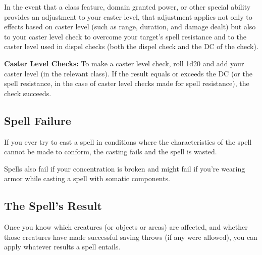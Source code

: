 In the event that a class feature, domain granted power, or other special ability provides an adjustment to your caster level, that adjustment applies not only to effects based on caster level (such as range, duration, and damage dealt) but also to your caster level check to overcome your target's spell resistance and to the caster level used in dispel checks (both the dispel check and the DC of the check).

\textbf{Caster Level Checks:} To make a caster level check, roll 1d20 and add your caster level (in the relevant class). If the result equals or exceeds the DC (or the spell resistance, in the case of caster level checks made for spell resistance), the check succeeds.

\subsection{Spell Failure}
If you ever try to cast a spell in conditions where the characteristics of the spell cannot be made to conform, the casting fails and the spell is wasted.

Spells also fail if your concentration is broken and might fail if you're wearing armor while casting a spell with somatic components.

\subsection{The Spell's Result}
Once you know which creatures (or objects or areas) are affected, and whether those creatures have made successful saving throws (if any were allowed), you can apply whatever results a spell entails.




